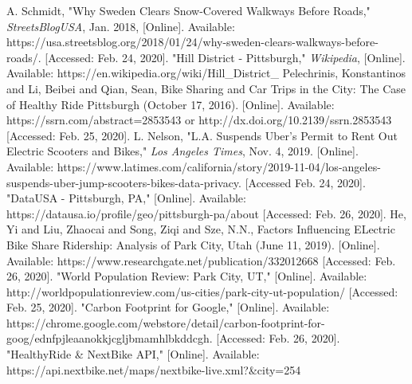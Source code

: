 \documentclass[letterpaper, 12 pt, conference]{ieeeconf}  %
\begin{document}
\begin{thebibliography}{99}
 A. Schmidt, "Why Sweden Clears Snow-Covered Walkways Before Roads," \textit{StreetsBlogUSA}, Jan. 2018, [Online]. Available: https://usa.streetsblog.org/2018/01/24/why-sweden-clears-walkways-before-roads/. [Accessed: Feb. 24, 2020].
 "Hill District - Pittsburgh," \textit{Wikipedia}, [Online]. Available: https://en.wikipedia.org/wiki/Hill\_District\_%
 Pelechrinis, Konstantinos and Li, Beibei and Qian, Sean, Bike Sharing and Car Trips in the City: The Case of Healthy Ride Pittsburgh (October 17, 2016). [Online]. Available: https://ssrn.com/abstract=2853543 or http://dx.doi.org/10.2139/ssrn.2853543 [Accessed: Feb. 25, 2020].
 L. Nelson, "L.A. Suspends Uber's Permit to Rent Out Electric Scooters and Bikes," \textit{Los Angeles Times}, Nov. 4, 2019. [Online]. Available: https://www.latimes.com/california/story/2019-11-04/los-angeles-suspends-uber-jump-scooters-bikes-data-privacy. [Accessed Feb. 24, 2020].
 "DataUSA - Pittsburgh, PA," [Online]. Available: https://datausa.io/profile/geo/pittsburgh-pa/about [Accessed: Feb. 26, 2020].
 He, Yi and Liu, Zhaocai and Song, Ziqi and Sze, N.N., Factors Influencing ELectric Bike Share Ridership: Analysis of Park City, Utah (June 11, 2019). [Online]. Available: https://www.researchgate.net/publication/332012668 [Accessed: Feb. 26, 2020].
  "World Population Review: Park City, UT," [Online]. Available: http://worldpopulationreview.com/us-cities/park-city-ut-population/ [Accessed: Feb. 25, 2020].
 "Carbon Footprint for Google," [Online]. Available: https://chrome.google.com/webstore/detail/carbon-footprint-for-goog/ednfpjleaanokkjcgljbmamhlbkddcgh. [Accessed: Feb. 26, 2020].
 "HealthyRide \& NextBike API," [Online]. Available: https://api.nextbike.net/maps/nextbike-live.xml?&city=254


\end{thebibliography}
\end{document}
